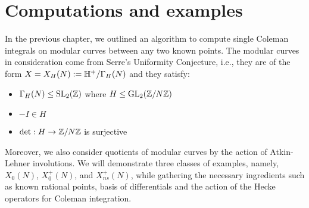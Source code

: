 \chapter{Computations and examples}

In the previous chapter, we outlined an algorithm to compute single Coleman integrals on modular curves between any two known points. The modular curves in consideration come from Serre's Uniformity Conjecture, i.e., they are of the form $X = X_H(N) := \mathbb{H}^+/\Gamma_H(N)$ and they satisfy:

\begin{itemize}
\item $\Gamma_H(N) \leq \operatorname{SL}_2(\mathbb{Z})$ where $H \leq \operatorname{GL}_2(\mathbb{Z}/N\mathbb{Z})$ 
\item $- I \in H$
\item $\det: H \rightarrow \mathbb{Z}/N\mathbb{Z}$ is surjective
\end{itemize}

Moreover, we also consider quotients of modular curves by the action of Atkin-Lehner involutions. We will demonstrate three classes of examples, namely, $X_0(N)$, $X_0^+(N)$, and $X_{ns}^+(N)$, while gathering the necessary ingredients such as known rational points, basis of differentials and the action of the Hecke operators for Coleman integration.